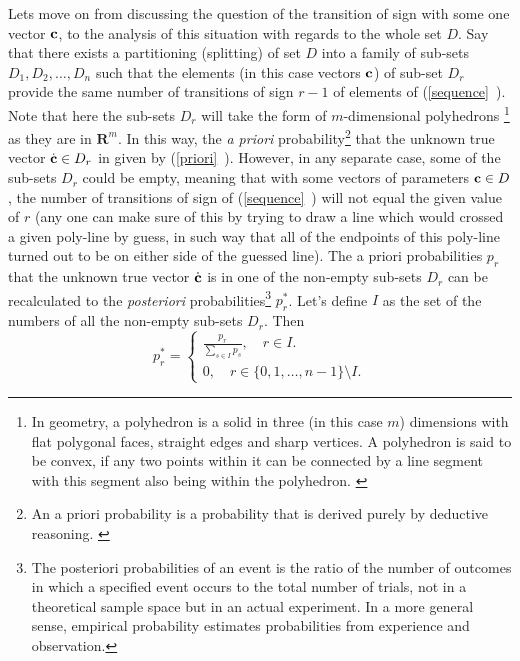 Lets move on from discussing the question of the transition of sign with some one vector $\textbf{c}$, to the analysis of this situation with regards to the whole set $D$. Say that there exists a partitioning (splitting) of set $D$ into a family of sub-sets $D_{1},D_{2},\dots,D_{n}$ such that the elements (in this case vectors $\textbf{c}$) of sub-set $D_{r}$ provide the same number  of transitions of sign $r-1$ of elements of (\vref{sequence}~). Note that here the sub-sets $D_{r}$ will take the form of $m$-dimensional polyhedrons \footnote{In geometry, a polyhedron is a solid in three (in this case $m$) dimensions with flat polygonal faces, straight edges and sharp vertices. A polyhedron is said to be convex, if any two points within it can be connected by a line segment with this segment also being within the polyhedron. \cite{cromwell_1999}} as they are in $\boldsymbol{R}^{m}$. In this way, the \textit{a priori} probability\footnote{An a priori probability is a probability that is derived purely by deductive reasoning. \cite{mood_graybill_boes_1974}} that the unknown true vector $\dot{\textbf{c}} \in D_{r}$ in given by (\vref{priori}~). However, in any separate case, some of the sub-sets $D_{r}$ could be empty, meaning  that with some vectors of parameters $\textbf{c} \in D$, the number of transitions of sign of (\vref{sequence}~) will not equal the given value of $r$ (any one can make sure of this by trying to draw a line which would crossed a given poly-line by guess, in such way that all of the endpoints of this poly-line turned out to be on either side of the guessed line). The a priori probabilities $p_{r}$ that the unknown true vector $\dot{\textbf{c}}$ is in one of the non-empty sub-sets $D_{r}$ can be recalculated to the \textit{posteriori} probabilities\footnote{The posteriori probabilities of an event is the ratio of the number of outcomes in which a specified event occurs to the total number of trials, not in a theoretical sample space but in an actual experiment. In a more general sense, empirical probability estimates probabilities from experience and observation.\cite{mood_graybill_boes_1974}} $p_{r}^{*}$. Let's define $I$ as the set of the numbers of all the non-empty sub-sets $D_{r}$. Then
\begin{equation}
p_{r}^{*}= 
\begin{cases} 
		\frac{p_{r}}{\sum\limits_{s \in I}p_{s}}, \quad r \in I.\\
		0, \quad r \in \{ 0,1,\dots,n-1 \} \setminus I.
\end{cases} \label{posteriori}
\end{equation}
